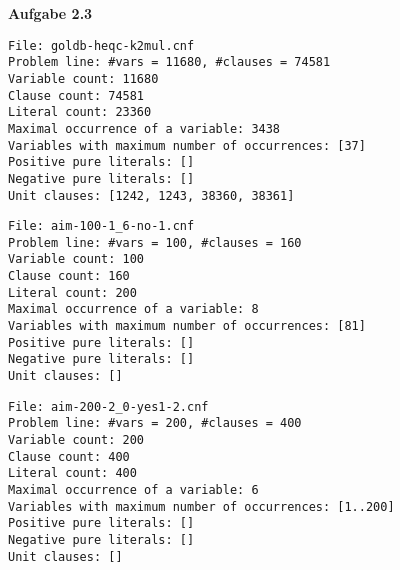 \documentclass[a4paper,10pt]{article}
\begin{document}
\noindent\textbf{Aufgabe 2.3}
\begin{lstlisting}
File: goldb-heqc-k2mul.cnf
Problem line: #vars = 11680, #clauses = 74581
Variable count: 11680
Clause count: 74581
Literal count: 23360
Maximal occurrence of a variable: 3438
Variables with maximum number of occurrences: [37]
Positive pure literals: []
Negative pure literals: []
Unit clauses: [1242, 1243, 38360, 38361]
\end{lstlisting}
\begin{lstlisting}
File: aim-100-1_6-no-1.cnf
Problem line: #vars = 100, #clauses = 160
Variable count: 100
Clause count: 160
Literal count: 200
Maximal occurrence of a variable: 8
Variables with maximum number of occurrences: [81]
Positive pure literals: []
Negative pure literals: []
Unit clauses: []
\end{lstlisting}
\begin{lstlisting}
File: aim-200-2_0-yes1-2.cnf
Problem line: #vars = 200, #clauses = 400
Variable count: 200
Clause count: 400
Literal count: 400
Maximal occurrence of a variable: 6
Variables with maximum number of occurrences: [1..200]
Positive pure literals: []
Negative pure literals: []
Unit clauses: []
\end{lstlisting}
\end{document}
